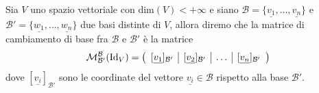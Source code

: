 \begin{definition}
  Sia $V$ uno spazio vettoriale con $\text{dim}(V) < +\infty$ e siano $\mathcal{B}=\{\underline{v_1}, \ldots, \underline{v_n} \}$ e $\mathcal{B}' = \{ \underline{w_1}, \ldots, \underline{w_n} \}$ due basi distinte di $V$, allora diremo che la matrice di cambiamento di base fra $\mathcal{B}$ e $\mathcal{B}'$ è la matrice
  $$
    \mathcal{M}^{\mathcal{B}}_{\mathcal{B}'}(\text{Id}_V) = \left( \begin{array}{c | c | c | c}
      [\underline{v_1}]_{\mathcal{B}'} & [\underline{v_2}]_{\mathcal{B}'} & \ldots & [\underline{v_n}]_{\mathcal{B}'}
    \end{array} \right)
  $$
  dove $[\underline{v_i}]_{\mathcal{B}'}$ sono le coordinate del vettore $\underline{v_i} \in \mathcal{B}$ rispetto alla base $\mathcal{B}'$.
\end{definition}

